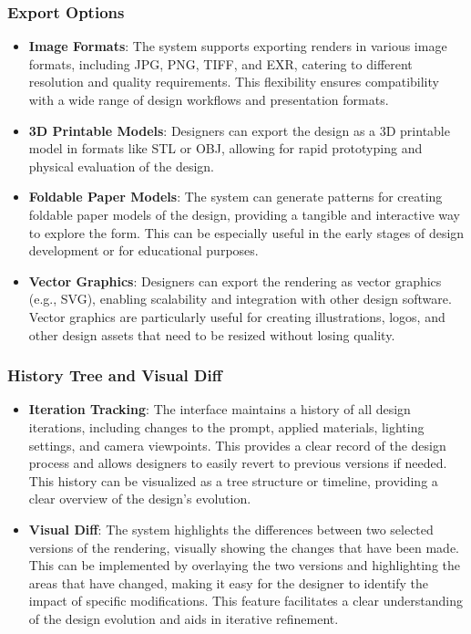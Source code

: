 \documentclass[12pt]{report}
\begin{document}
\subsubsection{Export Options}
\begin{itemize}
\item \textbf{Image Formats}: The system supports exporting renders in various image formats, including JPG, PNG, TIFF, and EXR, catering to different resolution and quality requirements. This flexibility ensures compatibility with a wide range of design workflows and presentation formats.
\item \textbf{3D Printable Models}: Designers can export the design as a 3D printable model in formats like STL or OBJ, allowing for rapid prototyping and physical evaluation of the design.
\item \textbf{Foldable Paper Models}: The system can generate patterns for creating foldable paper models of the design, providing a tangible and interactive way to explore the form. This can be especially useful in the early stages of design development or for educational purposes.
\item \textbf{Vector Graphics}: Designers can export the rendering as vector graphics (e.g., SVG), enabling scalability and integration with other design software. Vector graphics are particularly useful for creating illustrations, logos, and other design assets that need to be resized without losing quality.
\end{itemize}

\subsubsection{History Tree and Visual Diff}
\begin{itemize}
\item \textbf{Iteration Tracking}: The interface maintains a history of all design iterations, including changes to the prompt, applied materials, lighting settings, and camera viewpoints. This provides a clear record of the design process and allows designers to easily revert to previous versions if needed. This history can be visualized as a tree structure or timeline, providing a clear overview of the design's evolution.
\item \textbf{Visual Diff}: The system highlights the differences between two selected versions of the rendering, visually showing the changes that have been made. This can be implemented by overlaying the two versions and highlighting the areas that have changed, making it easy for the designer to identify the impact of specific modifications. This feature facilitates a clear understanding of the design evolution and aids in iterative refinement.
\end{itemize}
\end{document}
